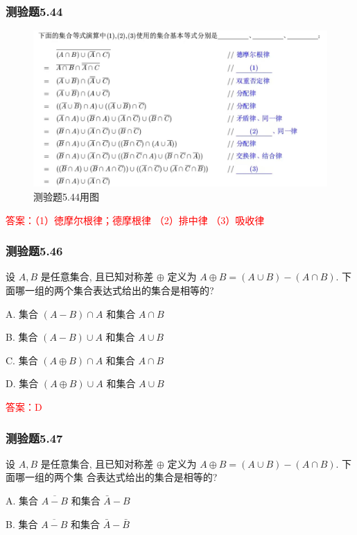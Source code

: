 \documentclass[UTF8, heading=true]{ctexart}
\begin{document}
\subsubsection{测验题5.44}
\begin{figure}[htbp]
    \centering
    \includegraphics[width=1\textwidth]{5.44.jpg} %
    \caption{测验题5.44用图}
\end{figure}

\textcolor{red}
{
  答案：（1）徳摩尔根律；德摩根律
  （2）排中律 
  （3）吸收律
}

\subsubsection{测验题5.46}
设 $A, B$ 是任意集合, 且已知对称差 $\oplus$ 定义为 $A \oplus B=(A \cup B)-(A \cap B)$. 下面哪一组的两个集合表达式给出的集合是相等的?

A. 集合 $(A-B) \cap A$ 和集合 $A \cap B$

B. 集合 $(A-B) \cup A$ 和集合 $A \cup B$

C. 集合 $(A \oplus B) \cap A$ 和集合 $A \cap B$

D. 集合 $(A \oplus B) \cup A$ 和集合 $A \cup B$

\textcolor{red}{答案：D}


\subsubsection{测验题5.47}

设 $A, B$ 是任意集合, 且已知对称差 $\oplus$ 定义为 $A \oplus B=(A \cup B)-(A \cap B)$. 下面哪一组的两个集
合表达式给出的集合是相等的?

A. 集合 $\overline{A-B}$ 和集合 $\bar{A}-B$

B. 集合 $\overline{A-B}$ 和集合 $\bar{A}-\bar{B}$
\end{document}
